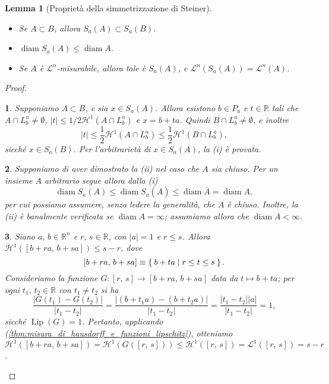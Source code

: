 \documentclass[a4paper,10pt,openright,oneside]{book}
\theoremstyle{theoremstyle}
\newtheorem{lemma}[teorema]{Lemma}
\theoremstyle{theoremstylewoheader}
\theoremstyle{theoremstyle}
\theoremstyle{proofsecstyle}
\newtheorem{proofsec}{}
\theoremstyle{nonumberplain}
\newtheorem{proof}{Dim.}
\newcommand{\RR}{\ensuremath{\mathbb{R}}}
\newcommand{\Leb}{\ensuremath{\mathcal{L}}}
\newcommand{\Haus}{\ensuremath{\mathcal{H}}}
\newcommand{\abs}[1]{\ensuremath{\lvert #1 \rvert}}
\newcommand{\closure}[1]{\ensuremath{\overline{#1}}}
\DeclareMathOperator{\diam}{diam}
\DeclareMathOperator{\Lip}{Lip}
\begin{document}
\begin{lemma}[Proprietà della simmetrizzazione di Steiner]
\label{lem:proprieta_simmetrizzazione_steiner}
\mbox{}
\begin{itemize}
\item[(i)] Se $A \subset B$, allora $S_a(A) \subset S_a(B)$.
\item[(ii)] $\diam S_a(A) \le \diam A$.
\item[(iii)] Se $A$ è $\Leb^n$-misurabile, allora tale è $S_a(A)$, e $\Leb^n(S_a(A)) = \Leb^n(A)$.
\end{itemize}
\end{lemma}

\begin{proof}
\begin{proofsec}
Supponiamo $A \subset B$, e sia $x \in S_a(A)$. Allora esistono $b \in P_a$ e $t \in \RR$ tali che $A \cap L_b^a \ne \emptyset$, $\abs{t} \le 1/2\Haus^1(A \cap L_b^a)$ e $x = b + ta$. Quindi $B \cap L_b^a \ne \emptyset$, e inoltre
\[
\abs{t} \le \frac{1}{2}\Haus^1(A \cap L_b^a) \le \frac{1}{2}\Haus^1(B\cap L_b^a),
\]
sicché $x \in S_a(B)$. Per l'arbitrarietà di $x \in S_a(A)$, la (i) è provata.
\end{proofsec}

\begin{proofsec}
Supponiamo di aver dimostrato la (ii) nel caso che $A$ sia chiuso. Per un insieme $A$ arbitrario segue allora dalla (i)
\[
\diam S_a(A) \le \diam S_a(\closure{A}) \le \diam \closure{A} = \diam A,
\]
per cui possiamo assumere, senza ledere la generalità, che $A$ è chiuso. Inoltre, la (ii) è banalmente verificata se $\diam A = \infty$; assumiamo allora che $\diam A < \infty$.
\end{proofsec}

\begin{proofsec}
\emph{Siano $a,\, b \in \RR^n$ e $r,\, s \in \RR$, con $\abs{a} = 1$ e $r \le s$. Allora $\Haus^1([b+ra,\, b+sa]) \le s-r$, dove}
\[
[b+ra,\, b+sa] \equiv \Set{ b + ta | r \le t \le s }.
\]
Consideriamo la funzione $G : [r,\, s] \rightarrow [b+ra,\, b+sa]$ data da $t \mapsto b+ta$; per ogni $t_1,\, t_2 \in \RR$ con $t_1 \ne t_2$ si ha
\[
\frac{\abs{G(t_1) - G(t_2)}}{\abs{t_1 - t_2}} = \frac{\abs{(b+t_1a) - (b+t_2a)}}{\abs{t_1 - t_2}} = \frac{\abs{t_1 - t_2}\abs{a}}{\abs{t_1 - t_2}} = 1,
\]
sicché $\Lip(G) = 1$. Pertanto, applicando (\ref{thm:misura_di_hausdorff_e_funzioni_lipschitz}), otteniamo $\Haus^1([b+ra,\, b+sa]) = \Haus^1(G([r,\, s])) \le \Haus^1([r,\, s]) = \Leb^1([r,\, s]) = s-r$.
\end{proofsec}


\end{proof}
\end{document}
